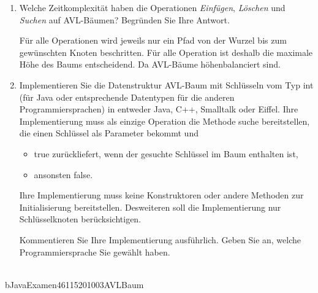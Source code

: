 \documentclass{bschlangaul-aufgabe}
\begin{document}
\begin{enumerate}
\begin{liAntwort}
\begin{liDiagramm}{Nach der Rechtsrotation}
\end{liDiagramm}

\begin{liDiagramm}{Nach Einfügen von „3“}
\end{liDiagramm}
\end{liAntwort}

\item Welche Zeitkomplexität haben die Operationen \emph{Einfügen},
\emph{Löschen} und \emph{Suchen} auf AVL-Bäumen? Begründen Sie Ihre
Antwort.

\begin{liAntwort}
Für alle Operationen wird jeweils nur ein Pfad von der Wurzel bis zum
gewünschten Knoten beschritten. Für alle Operation ist deshalb die
maximale Höhe des Baums entscheidend. Da AVL-Bäume höhenbalanciert sind.

\end{liAntwort}

\item Implementieren Sie die Datenstruktur AVL-Baum mit Schlüsseln vom
Typ int (für Java oder entsprechende Datentypen für die anderen
Programmiersprachen) in entweder Java, C++, Smalltalk oder Eiffel. Ihre
Implementierung muss als einzige Operation die Methode suche
bereitstellen, die einen Schlüssel als Parameter bekommt und

\begin{itemize}
\item true zurückliefert, wenn der gesuchte Schlüssel im Baum enthalten
ist,

\item ansonsten false.
\end{itemize}

Ihre Implementierung muss keine Konstruktoren oder andere Methoden zur
Initialisierung bereitstellen. Desweiteren soll die Implementierung nur
Schlüsselknoten berücksichtigen.

Kommentieren Sie Ihre Implementierung ausführlich. Geben Sie an, welche
Programmiersprache Sie gewählt haben.
\end{enumerate}

\\bJavaExamen{46115}{2010}{03}{AVLBaum}
\end{document}
